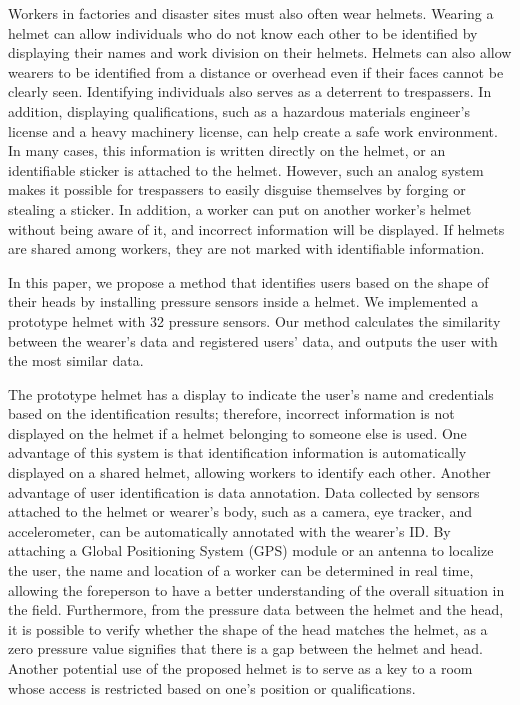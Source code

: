 \documentclass[english,preprint,JIP]{ipsj}
\begin{document}
Workers in factories and disaster sites must also often wear helmets. Wearing a helmet can allow individuals who do not know each other to be identified by displaying their names and work division on their helmets. Helmets can also allow wearers to be identified from a distance or overhead even if their faces cannot be clearly seen. Identifying individuals also serves as a deterrent to trespassers. In addition, displaying qualifications, such as a hazardous materials engineer's license and a heavy machinery license, can help create a safe work environment. In many cases, this information is written directly on the helmet, or an identifiable sticker is attached to the helmet. However, such an analog system makes it possible for trespassers to easily disguise themselves by forging or stealing a sticker. In addition, a worker can put on another worker's helmet without being aware of it, and incorrect information will be displayed. If helmets are shared among workers, they are not marked with identifiable information.\par

In this paper, we propose a method that identifies users based on the shape of their heads by installing pressure sensors inside a helmet. We implemented a prototype helmet with 32 pressure sensors. Our method calculates the similarity between the wearer's data and registered users' data, and outputs the user with the most similar data.\par

The prototype helmet has a display to indicate the user's name and credentials based on the identification results; therefore, incorrect information is not displayed on the helmet if a helmet belonging to someone else is used. One advantage of this system is that identification information is automatically displayed on a shared helmet, allowing workers to identify each other. Another advantage of user identification is data annotation. Data collected by sensors attached to the helmet or wearer's body, such as a camera, eye tracker, and accelerometer, can be automatically annotated with the wearer's ID. By attaching a Global Positioning System (GPS) module or an antenna to localize the user\cite{disaster_en}, the name and location of a worker can be determined in real time, allowing the foreperson to have a better understanding of the overall situation in the field. Furthermore, from the pressure data between the helmet and the head, it is possible to verify whether the shape of the head matches the helmet, as a zero pressure value signifies that there is a gap between the helmet and head. Another potential use of the proposed helmet is to serve as a key to a room whose access is restricted based on one's position or qualifications.\par
\end{document}
